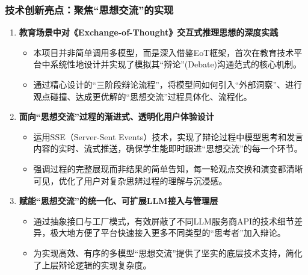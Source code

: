 \documentclass[aspectratio=169]{beamer} %
\begin{document}
\begin{frame}
\frametitle{技术创新亮点：聚焦“思想交流”的实现}
\begin{enumerate}
    \item \textbf{教育场景中对《Exchange-of-Thought》交互式推理思想的深度实践}
    \begin{itemize}
        \item 本项目并非简单调用多模型，而是深入借鉴EoT框架，首次在教育技术平台中系统性地设计并实现了模拟其“辩论”(Debate)沟通范式的核心机制。
        \item 通过精心设计的“三阶段辩论流程”，将模型间如何引入“外部洞察”、进行观点碰撞、达成更优解的“思想交流”过程具体化、流程化。
    \end{itemize}

    \item \textbf{面向“思想交流”过程的渐进式、透明化用户体验设计}
    \begin{itemize}
        \item 运用SSE（Server-Sent Events）技术，实现了辩论过程中模型思考和发言内容的实时、流式推送，确保学生能即时跟进“思想交流”的每一个环节。
        \item 强调过程的完整展现而非结果的简单告知，每一轮观点交换和演变都清晰可见，优化了用户对复杂思辨过程的理解与沉浸感。
    \end{itemize}

    \item \textbf{赋能“思想交流”的统一化、可扩展LLM接入与管理层}
    \begin{itemize}
        \item 通过抽象接口与工厂模式，有效屏蔽了不同LLM服务商API的技术细节差异，极大地方便了平台快速接入更多不同类型的“思考者”加入辩论。
        \item 为实现高效、有序的多模型“思想交流”提供了坚实的底层技术支持，简化了上层辩论逻辑的实现复杂度。
    \end{itemize}
\end{enumerate}
\end{frame}
\end{document}
